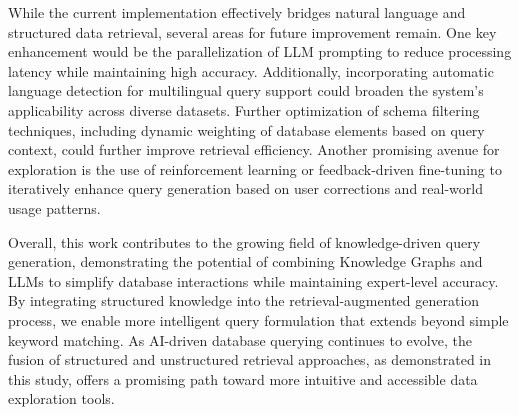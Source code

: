 While the current implementation effectively bridges natural language and structured data retrieval, several areas for future improvement remain. One key enhancement would be the parallelization of LLM prompting to reduce processing latency while maintaining high accuracy. Additionally, incorporating automatic language detection for multilingual query support could broaden the system’s applicability across diverse datasets. Further optimization of schema filtering techniques, including dynamic weighting of database elements based on query context, could further improve retrieval efficiency. Another promising avenue for exploration is the use of reinforcement learning or feedback-driven fine-tuning to iteratively enhance query generation based on user corrections and real-world usage patterns.  

Overall, this work contributes to the growing field of knowledge-driven query generation, demonstrating the potential of combining Knowledge Graphs and LLMs to simplify database interactions while maintaining expert-level accuracy. By integrating structured knowledge into the retrieval-augmented generation process, we enable more intelligent query formulation that extends beyond simple keyword matching. As AI-driven database querying continues to evolve, the fusion of structured and unstructured retrieval approaches, as demonstrated in this study, offers a promising path toward more intuitive and accessible data exploration tools.